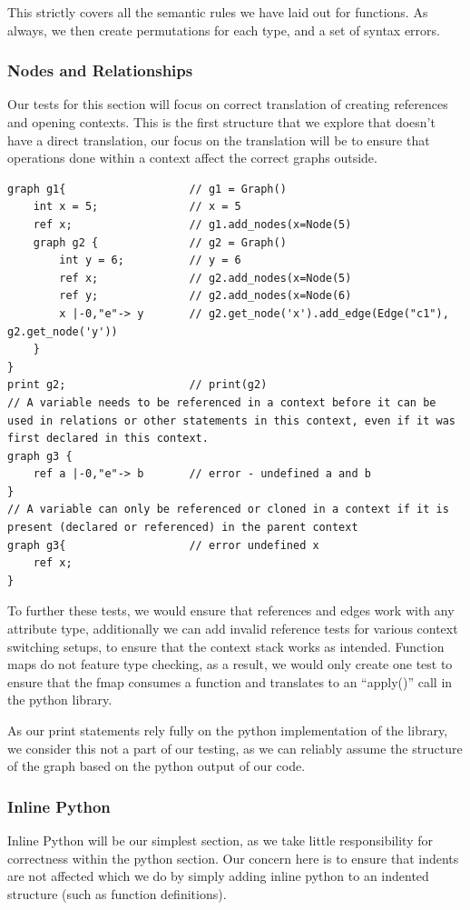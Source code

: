 This strictly covers all the semantic rules we have laid out for functions.
As always, we then create permutations for each type, and a set of syntax errors.

\subsubsection{Nodes and Relationships}
Our tests for this section will focus on correct translation of creating references and opening contexts.
This is the first structure that we explore that doesn't have a direct translation, our focus on the translation will
be to ensure that operations done within a context affect the correct graphs outside.

\begin{lstlisting}[caption={Testing graphs},captionpos=b, label={lst:lattice-graph-test}]
graph g1{                   // g1 = Graph()
    int x = 5;              // x = 5
    ref x;                  // g1.add_nodes(x=Node(5)
    graph g2 {              // g2 = Graph()
        int y = 6;          // y = 6
        ref x;              // g2.add_nodes(x=Node(5)
        ref y;              // g2.add_nodes(x=Node(6)
        x |-0,"e"-> y       // g2.get_node('x').add_edge(Edge("c1"), g2.get_node('y'))
    }
}
print g2;                   // print(g2)
// A variable needs to be referenced in a context before it can be used in relations or other statements in this context, even if it was first declared in this context.
graph g3 {
    ref a |-0,"e"-> b       // error - undefined a and b
}
// A variable can only be referenced or cloned in a context if it is present (declared or referenced) in the parent context
graph g3{                   // error undefined x
    ref x;
}
\end{lstlisting}

To further these tests, we would ensure that references and edges work with any attribute type, additionally we can
add invalid reference tests for various context switching setups, to ensure that the context stack works as intended.
Function maps do not feature type checking, as a result, we would only create one test to ensure that the fmap consumes
a function and translates to an ``apply()'' call in the python library.

As our print statements rely fully on the python implementation of the library, we consider this not a part of our
testing, as we can reliably assume the structure of the graph based on the python output of our code.

\subsubsection{Inline Python}
Inline Python will be our simplest section, as we take little responsibility for correctness within the python section.
Our concern here is to ensure that indents are not affected which we do by simply adding inline python to an indented
structure (such as function definitions).

